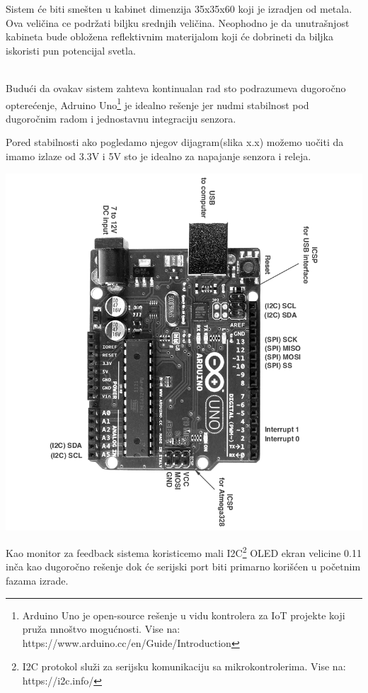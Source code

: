 \documentclass[a4paper,11pt]{book}
\begin{document}
Sistem će biti smešten u kabinet dimenzija 35x35x60 koji je izradjen od metala. Ova veličina ce podržati biljku srednjih veličina. Neophodno je da unutrašnjost kabineta bude obložena reflektivnim materijalom koji će dobrineti da biljka iskoristi pun potencijal svetla.

\noindent \\ Budući da ovakav sistem zahteva kontinualan rad sto podrazumeva dugoročno opterećenje, Adruino Uno\footnote{Arduino Uno je open-source rešenje u vidu kontrolera za IoT projekte koji pruža mnoštvo mogućnosti. Vise na: https://www.arduino.cc/en/Guide/Introduction} je idealno rešenje jer nudmi stabilnost pod dugoročnim radom i jednostavnu integraciju senzora. 

Pored stabilnosti ako pogledamo njegov dijagram(slika x.x) možemo uočiti da imamo izlaze od 3.3V i 5V sto je idealno za napajanje senzora i releja.

\includegraphics[width=\textwidth]{uno_pinout.png}

Kao monitor za feedback sistema koristicemo mali I2C\footnote{I2C protokol služi za serijsku komunikaciju sa mikrokontrolerima. Vise na: https://i2c.info/} OLED ekran velicine 0.11 inča kao dugoročno rešenje dok će serijski port biti primarno korišćen u početnim fazama izrade.
\end{document}
